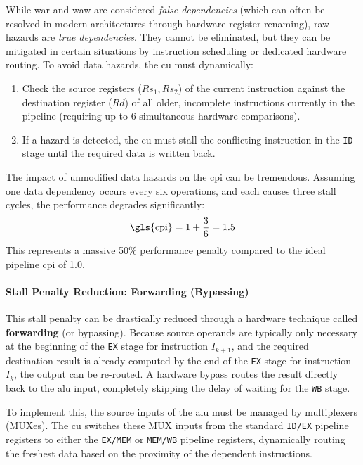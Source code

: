While \gls{war} and \gls{waw} are considered \textit{false dependencies} (which can often be resolved in modern architectures through hardware register renaming), \gls{raw} hazards are \textit{true dependencies}. They cannot be eliminated, but they can be mitigated in certain situations by instruction scheduling or dedicated hardware routing. To avoid data hazards, the \gls{cu} must dynamically:
\begin{enumerate}
    \item Check the source registers (\(Rs_1, Rs_2\)) of the current instruction against the destination register (\(Rd\)) of all older, incomplete instructions currently in the pipeline (requiring up to 6 simultaneous hardware comparisons).
    \item If a hazard is detected, the \gls{cu} must stall the conflicting instruction in the \texttt{ID} stage until the required data is written back.
\end{enumerate}

The impact of unmodified data hazards on the \gls{cpi} can be tremendous. Assuming one data dependency occurs every six operations, and each causes three stall cycles, the performance degrades significantly:
\[
    \text{\gls{cpi}} = 1 + \frac{3}{6} = 1.5
\]
This represents a massive 50\% performance penalty compared to the ideal pipeline \gls{cpi} of 1.0.

\paragraph{Stall Penalty Reduction: Forwarding (Bypassing)} 
This stall penalty can be drastically reduced through a hardware technique called \textbf{forwarding} (or bypassing). Because source operands are typically only necessary at the beginning of the \texttt{EX} stage for instruction \(I_{k+1}\), and the required destination result is already computed by the end of the \texttt{EX} stage for instruction \(I_k\), the output can be re-routed. A hardware bypass routes the result directly back to the \gls{alu} input, completely skipping the delay of waiting for the \texttt{WB} stage.

To implement this, the source inputs of the \gls{alu} must be managed by multiplexers (MUXes). The \gls{cu} switches these MUX inputs from the standard \texttt{ID/EX} pipeline registers to either the \texttt{EX/MEM} or \texttt{MEM/WB} pipeline registers, dynamically routing the freshest data based on the proximity of the dependent instructions.

